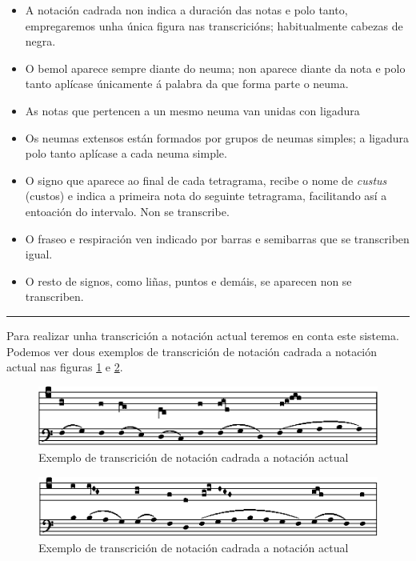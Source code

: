 \documentclass[a4paper, twoside]{templates/ociamthesis}
\providecommand{\tightlist}{%
  \setlength{\itemsep}{0pt}\setlength{\parskip}{0pt}}
\begin{document}
\begin{itemize}
\tightlist
\item
  A notación cadrada non indica a duración das notas e polo tanto, empregaremos unha única figura nas transcricións; habitualmente cabezas de negra.
\item
  O bemol aparece sempre diante do neuma; non aparece diante da nota e polo tanto aplícase únicamente á palabra da que forma parte o neuma.
\item
  As notas que pertencen a un mesmo neuma van unidas con ligadura
\item
  Os neumas extensos están formados por grupos de neumas simples; a ligadura polo tanto aplícase a cada neuma simple.
\item
  O signo que aparece ao final de cada tetragrama, recibe o nome de \emph{custus} (custos) e indica a primeira nota do seguinte tetragrama, facilitando así a entoación do intervalo. Non se transcribe.
\item
  O fraseo e respiración ven indicado por barras e semibarras que se transcriben igual.
\item
  O resto de signos, como liñas, puntos e demáis, se aparecen non se transcriben.
\end{itemize}

\begin{center}\rule{0.5\linewidth}{0.5pt}\end{center}

Para realizar unha transcrición a notación actual teremos en conta este sistema. Podemos ver dous exemplos de transcrición de notación cadrada a notación actual nas figuras \ref{fig:notacion-cadrada-exemplo1} e \ref{fig:notacion-cadrada-exemplo2}.

\begin{figure}[ht]

{\centering \includegraphics[width=0.75\linewidth]{figures/ud-03/notacion-cadrada-exemplo1} 

}

\caption[Exemplo 1 de transcrición]{Exemplo de transcrición de notación cadrada a notación actual}\label{fig:notacion-cadrada-exemplo1}
\end{figure}

\begin{figure}[ht]

{\centering \includegraphics[width=0.75\linewidth]{figures/ud-03/notacion-cadrada-exemplo2} 

}

\caption[Exemplo 2 de transcrición]{Exemplo de transcrición de notación cadrada a notación actual}\label{fig:notacion-cadrada-exemplo2}
\end{figure}
\end{document}
